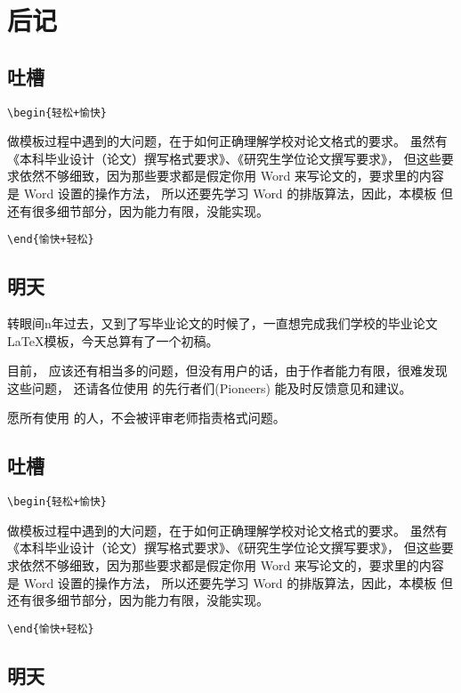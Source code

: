 \chapter{后记}

\section{吐槽}

\verb!\begin{轻松+愉快}!

做模板过程中遇到的大问题，在于如何正确理解学校对论文格式的要求。
虽然有《本科毕业设计（论文）撰写格式要求》、《研究生学位论文撰写要求》，
但这些要求依然不够细致，因为那些要求都是假定你用 Word 来写论文的，要求里的内容是 Word 设置的操作方法，
所以还要先学习 Word 的排版算法，因此，本模板
但还有很多细节部分，因为能力有限，没能实现。

\verb!\end{愉快+轻松}!

\section{明天}

转眼间n年过去，又到了写毕业论文的时候了，一直想完成我们学校的毕业论文\LaTeX{}模板，今天总算有了一个初稿。

目前， \nwafuthesis{} 应该还有相当多的问题，但没有用户的话，由于作者能力有限，很难发现这些问题，
还请各位使用 \nwafuthesis{} 的先行者们(Pioneers) 能及时反馈意见和建议。

愿所有使用 \nwafuthesis{} 的人，不会被评审老师指责格式问题。

\section{吐槽}

\verb!\begin{轻松+愉快}!

做模板过程中遇到的大问题，在于如何正确理解学校对论文格式的要求。
虽然有《本科毕业设计（论文）撰写格式要求》、《研究生学位论文撰写要求》，
但这些要求依然不够细致，因为那些要求都是假定你用 Word 来写论文的，要求里的内容是 Word 设置的操作方法，
所以还要先学习 Word 的排版算法，因此，本模板
但还有很多细节部分，因为能力有限，没能实现。

\verb!\end{愉快+轻松}!

\section{明天}

